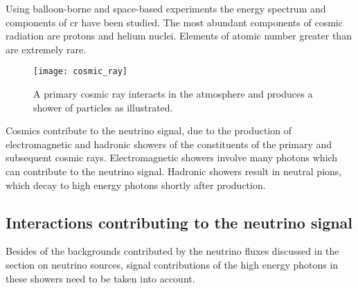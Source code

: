 Using balloon-borne and space-based experiments the energy spectrum and components of \gls{cr} have been studied\cite{Maestro:2015lla}.
The most abundant components of cosmic radiation are protons and helium nuclei.
Elements of atomic number greater than  are extremely rare.

\begin{figure}
  \centering
  \texttt{[image: cosmic\_ray]}
  \caption{%
    A primary cosmic ray interacts in the atmosphere and produces a shower of particles as illustrated.
  }
  \label{fig:particle_shower}
\end{figure}

Cosmics contribute to the neutrino signal, due to the production of electromagnetic and hadronic showers of the constituents of the primary and subsequent cosmic rays.
Electromagnetic showers involve many photons which can contribute to the neutrino signal.
Hadronic showers result in neutral pions, which decay to high energy photons shortly after production.

\subsection{Interactions contributing to the neutrino signal}

Besides of the backgrounds contributed by the neutrino fluxes discussed in the section on neutrino sources, signal contributions of the high energy photons in these showers need to be taken into account.

